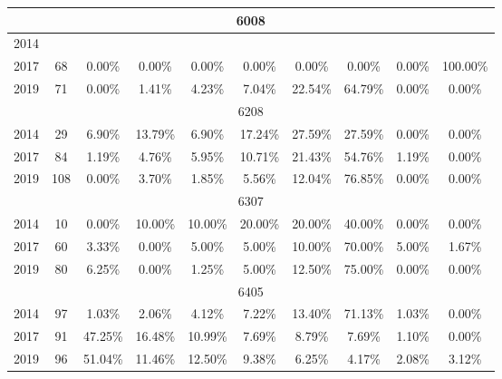 \begin{table}[H]
\begin{tabular}{|l|c|ccc|ccc|cc|}
\hline
\hline
\multicolumn{10}{|c|}{6008}\\
\hline
2014 & & & & & & & & & \\
2017 & 68 & 0.00\% & 0.00\% & 0.00\% & 0.00\% & 0.00\% & 0.00\% & 0.00\% & 100.00\%\\
2019 & 71 & 0.00\% & 1.41\% & 4.23\% & 7.04\% & 22.54\% & 64.79\% & 0.00\% & 0.00\%\\
\hline
\hline
\multicolumn{10}{|c|}{6208}\\
\hline
2014 & 29 & 6.90\% & 13.79\% & 6.90\% & 17.24\% & 27.59\% & 27.59\% & 0.00\% & 0.00\%\\
2017 & 84 & 1.19\% & 4.76\% & 5.95\% & 10.71\% & 21.43\% & 54.76\% & 1.19\% & 0.00\%\\
2019 & 108 & 0.00\% & 3.70\% & 1.85\% & 5.56\% & 12.04\% & 76.85\% & 0.00\% & 0.00\%\\
\hline
\hline
\multicolumn{10}{|c|}{6307}\\
\hline
2014 & 10 & 0.00\% & 10.00\% & 10.00\% & 20.00\% & 20.00\% & 40.00\% & 0.00\% & 0.00\%\\
2017 & 60 & 3.33\% & 0.00\% & 5.00\% & 5.00\% & 10.00\% & 70.00\% & 5.00\% & 1.67\%\\
2019 & 80 & 6.25\% & 0.00\% & 1.25\% & 5.00\% & 12.50\% & 75.00\% & 0.00\% & 0.00\%\\
\hline
\hline
\multicolumn{10}{|c|}{6405}\\
\hline
2014 & 97 & 1.03\% & 2.06\% & 4.12\% & 7.22\% & 13.40\% & 71.13\% & 1.03\% & 0.00\%\\
2017 & 91 & 47.25\% & 16.48\% & 10.99\% & 7.69\% & 8.79\% & 7.69\% & 1.10\% & 0.00\%\\
2019 & 96 & 51.04\% & 11.46\% & 12.50\% & 9.38\% & 6.25\% & 4.17\% & 2.08\% & 3.12\%\\
\hline
\bottomrule
\end{tabular}
\end{table}
